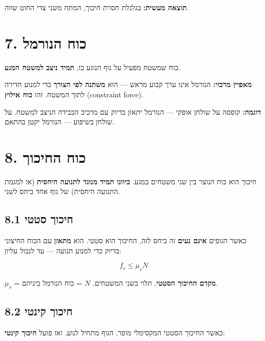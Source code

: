\documentclass[12pt, a4paper]{article}
\begin{document}
\textbf{תוצאה מעשית:} בגלגלת חסרת חיכוך, המתח משני צדי החוט שווה.

\section*{7. כוח הנורמל}

\begin{tcolorbox}[defbox, title={כוח הנורמל}]
כוח שמשטח מפעיל על גוף הנוגע בו, \textbf{תמיד ניצב למשטח המגע}.
\end{tcolorbox}

\textbf{מאפיין מרכזי:} הנורמל אינו ערך קבוע מראש --- הוא \textbf{משתנה לפי הצורך} כדי למנוע חדירה לתוך המשטח. זהו \textbf{כוח אילוץ} (\textenglish{constraint force}).

\textbf{דוגמה:} קופסה על שולחן אופקי --- הנורמל יתאזן בדיוק עם מרכיב הכבידה הניצב למשטח. על שולחן בשיפוע --- הנורמל יקטן בהתאם.

\section*{8. כוח החיכוך}

חיכוך הוא כוח הנוצר בין שני משטחים במגע. \textbf{כיוונו תמיד מנוגד לתנועה היחסית} (או למגמת התנועה היחסית) של גוף אחד ביחס לשני.

\subsection*{8.1 חיכוך סטטי}

כאשר הגופים \textbf{אינם נעים} זה ביחס לזה, החיכוך הוא סטטי. הוא \textbf{מתאזן} עם הכוח החיצוני בדיוק כדי למנוע תנועה --- עד לגבול עליון:

\begin{tcolorbox}[resultbox]
\[
  f_s \le \mu_s N
\]
\end{tcolorbox}

\textenglish{$\mu_s$} = \textbf{מקדם החיכוך הסטטי}, תלוי בשני המשטחים. \textenglish{$N$} = כוח הנורמל ביניהם.

\subsection*{8.2 חיכוך קינטי}

כאשר החיכוך הסטטי המקסימלי מופר, הגוף מתחיל לנוע, ואז פועל \textbf{חיכוך קינטי}:
\end{document}
